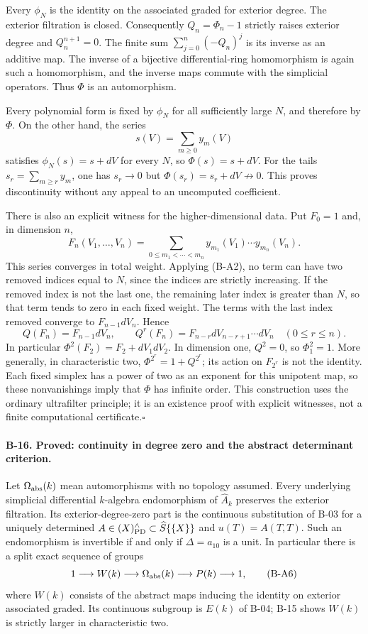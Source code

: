 Every $\phi_N$ is the identity on the associated graded for exterior
degree. The exterior filtration is closed. Consequently
$Q_n=\Phi_n-1$ strictly raises exterior degree and $Q_n^{n+1}=0$.
The finite sum $\sum_{j=0}^n(-Q_n)^j$ is its inverse as an additive
map. The inverse of a bijective differential-ring homomorphism is
again such a homomorphism, and the inverse maps commute with the
simplicial operators. Thus $\Phi$ is an automorphism.

Every polynomial form is fixed by $\phi_N$ for all sufficiently
large $N$, and therefore by $\Phi$. On the other hand, the series
\[
 s(V)=\sum_{m\geq0}y_m(V)
\]
satisfies $\phi_N(s)=s+dV$ for every $N$, so
$\Phi(s)=s+dV$. For the tails
$s_r=\sum_{m\geq r}y_m$, one has $s_r\to0$ but
$\Phi(s_r)=s_r+dV\not\to0$. This proves discontinuity without any
appeal to an uncomputed coefficient.

There is also an explicit witness for the higher-dimensional data.
Put $F_0=1$ and, in dimension $n$,
\[
 F_n(V_1,\ldots,V_n)=
   \sum_{0\leq m_1<\cdots<m_n}
          y_{m_1}(V_1)\cdots y_{m_n}(V_n).
 \tag{B-A4}
\]
This series converges in total weight. Applying (B-A2), no term can
have two removed indices equal to $N$, since the indices are
strictly increasing. If the removed index is not the last one,
the remaining later index is greater than $N$, so that term tends
to zero in each fixed weight. The terms with the last index removed
converge to $F_{n-1}dV_n$. Hence
\[
 Q(F_n)=F_{n-1}dV_n,\qquad
 Q^r(F_n)=F_{n-r}dV_{n-r+1}\cdots dV_n\quad(0\leq r\leq n).
 \tag{B-A5}
\]
In particular $\Phi^2(F_2)=F_2+dV_1dV_2$. In dimension one,
$Q^2=0$, so $\Phi_1^2=1$. More generally, in characteristic two,
$\Phi^{2^r}=1+Q^{2^r}$; its action on $F_{2^r}$ is not the identity.
Each fixed simplex has a power of two as an exponent for this
unipotent map, so these nonvanishings imply that $\Phi$ has infinite
order. This construction uses the ordinary ultrafilter principle;
it is an existence proof with explicit witnesses, not a finite
computational certificate.\hfill$\square$

\paragraph{B-16. Proved: continuity in degree zero and the abstract determinant criterion.}
Let $\Omega_{\rm abs}(k)$ mean automorphisms with no topology
assumed. Every underlying simplicial differential $k$-algebra
endomorphism of $\widehat A_k$ preserves the exterior filtration.
Its exterior-degree-zero part is the continuous substitution of
B-03 for a uniquely determined
$A\in(X)_{\rm PD}^{\wedge}\subset\widehat S\{\{X\}\}$ and
$u(T)=A(T,T)$. Such an endomorphism is invertible if and only if
$\Delta=a_{10}$ is a unit. In particular there is a split exact
sequence of groups
\[
 1\longrightarrow W(k)\longrightarrow\Omega_{\rm abs}(k)
       \longrightarrow P(k)\longrightarrow1,
 \tag{B-A6}
\]
where $W(k)$ consists of the abstract maps inducing the identity on
exterior associated graded. Its continuous subgroup is $E(k)$ of
B-04; B-15 shows $W(k)$ is strictly larger in characteristic two.


